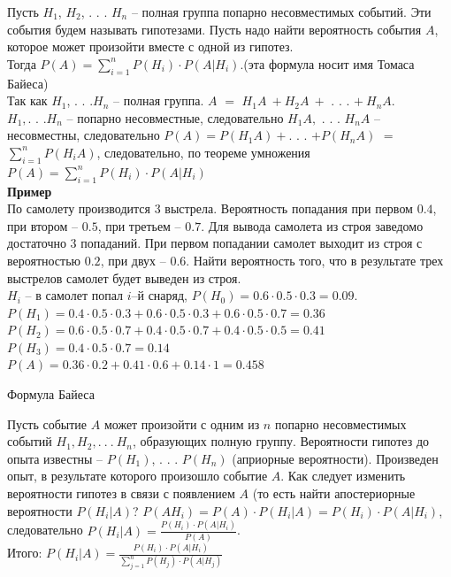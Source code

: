 \documentclass[russian, 12pt, fleqn,x11names]{article}
\begin{document}
Пусть $H_1$, $H_2$, . . . $H_n$ -- полная группа попарно несовместимых событий. Эти события будем называть гипотезами. Пусть надо найти вероятность события $A$, которое может произойти вместе с одной из гипотез.\\ Тогда $P(A)=\sum\limits_{i=1}^{n}P(H_i) \cdot P(A|H_i).$(эта формула носит имя Томаса Байеса)\\
Так как $H_1$, . . .$H_n$ -- полная группа. $A$ $=$ $H_1A\ +H_2A\ +$  . . .  $+\ H_nA$.\\
 $H_1,$. . .$H_n$ -- попарно несовместные, следовательно $H_1A,$ . . . $H_nA$ -- несовместны, следовательно $P(A)=P(H_1A) +$. . . $ + P(H_nA)$ $=$ $\sum\limits_{i = 1}^{n} P(H_iA)$, следовательно, по теореме умножения $P(A)=\sum\limits_{i = 1}^{n}P(H_i)\cdot P(A|H_i)$\\
\textbf{Пример\ }\\По самолету производится 3 выстрела. Вероятность попадания при первом $0.4$, при втором -- $0.5$, при третьем -- $0.7$. Для вывода самолета из
 строя заведомо достаточно 3 попаданий. При первом попадании самолет выходит из строя с вероятностью $0.2$, при двух -- $0.6$. Найти вероятность того, что в результате трех выстрелов самолет будет выведен из строя.\\
$H_i$ -- в самолет попал $i$--й снаряд, $P(H_0)=0.6\cdot0.5\cdot0.3=0.09$. \\
$P(H_1)=0.4\cdot0.5\cdot0.3+0.6\cdot0.5\cdot0.3+0.6\cdot0.5\cdot0.7=0.36$\\
$P(H_2)=0.6\cdot0.5\cdot 0.7+0.4\cdot0.5\cdot0.7+0.4\cdot0.5\cdot0.5=0.41$\\
$P(H_3)=0.4\cdot0.5\cdot0.7=0.14$\\
$P(A)=0.36\cdot0.2+0.41\cdot0.6+0.14\cdot1=0.458$\\
\begin{center}
$\textbf{Формула Байеса }$
\end{center}
Пусть событие $A$ может произойти с одним из $n$ попарно несовместимых событий $H_1, H_2, .\ .\ .\ H_n$, образующих полную группу. Вероятности гипотез до опыта известны -- $P(H_1)$, . . . $P(H_n)$ (априорные вероятности). Произведен опыт, в результате которого произошло событие $A$. Как следует изменить вероятности гипотез в связи с появлением $A$ (то есть найти апостериорные вероятности $P(H_i|A)$?
$P(AH_i)=P(A)\cdot P(H_i|A) = P(H_i) \cdot P(A|H_i)$, следовательно $P(H_i|A) = \frac{P(H_i) \cdot P(A|H_i)}{P(A)}$.\\
Итого: $P(H_i|A) = \frac{P(H_i)\cdot P(A|H_i)}{ \sum\limits_{j=1}^{n}P(H_j)\cdot P(A|H_j) }$\\
\end{document}
